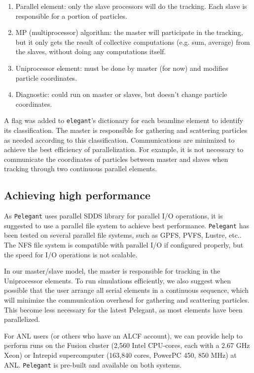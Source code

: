 \documentclass[11pt]{article}
\begin{document}
\begin{enumerate}
\item Parallel element: only the slave processors will do the tracking. 
Each slave is responsible for a portion of particles.

\item MP (multiprocessor) algorithm: the master will participate in
the tracking, but it only gets the result of collective computations
(e.g. sum, average) from the slaves, without doing any computations itself.

\item Uniprocessor element: must be done by master (for now) and modifies
particle coordinates.
\item Diagnostic: could run on master or slaves, but doesn't change particle coordinates.
\end{enumerate}

A flag was added to {\tt elegant}'s dictionary for each beamline
element to identify its classification. The master is responsible for
gathering and scattering particles as needed according to this
classification. Communications are minimized to achieve the best
efficiency of parallelization. For example, it is not necessary to
communicate the coordinates of particles between master and slaves
when tracking through two continuous parallel elements.

\subsection {Achieving high performance}
As {\tt Pelegant} uses parallel SDDS library for parallel I/O operations, it is suggested to use a parallel file
system to achieve best performance. {\tt Pelegant} has been tested on several parallel file systems, such as GPFS, 
PVFS, Lustre, etc.. The NFS file system is compatible with parallel I/O if configured properly, but the
speed for I/O operations is not scalable.

In our master/slave model, the master is responsible for tracking in the Uniprocessor 
elements. To run simulations efficiently, we also suggest when possible that the user arrange all serial 
elements in a continuous sequence, which will minimize the communication 
overhead for gathering and scattering particles. This become less necessary for the latest Pelegant, as 
most elements have been parallelized. 

For ANL users (or others who have an ALCF account), we can provide help to perform runs on the Fusion 
cluster (2,560 Intel CPU-cores, each with a 2.67 GHz Xeon) or Intrepid supercomputer (163,840 cores, PowerPC 450, 850 MHz) at ANL.  {\tt Pelegant} is pre-built and available on both systems. 
\end{document}
